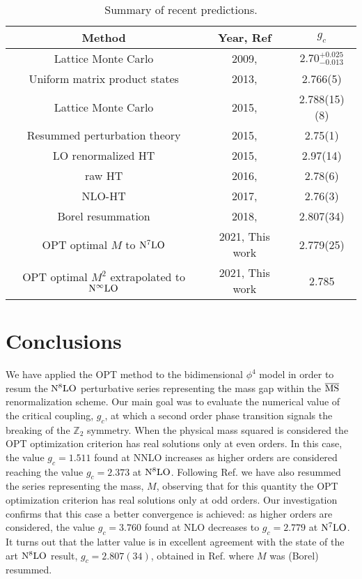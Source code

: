 \documentclass[a4paper,11pt]{article}
\def\ms{\overline {\rm MS}}
\begin{document}
\begin{table}[ht!]
    \centering
    \begin{tabular}{ |c|c|c| }
        \hline
        Method & Year, Ref & $g_c$  \\
        \hline\hline
        Lattice Monte Carlo & 2009, \cite{lattice5} & $2.70^{+0.025}_{-0.013}$   \\ 
        Uniform matrix product states & 2013, \cite{lattice2} & 2.766(5)    \\
        Lattice Monte Carlo & 2015, \cite{lattice1} & 2.788(15)(8)  \\
        Resummed perturbation theory & 2015, \cite{rpt} & 2.75(1) \\
        \hline
        LO renormalized HT & 2015, \cite{hamilton1} & 2.97(14) \\
        raw HT & 2016, \cite{hamilton3} & 2.78(6) \\
        NLO-HT & 2017, \cite{hamilton7} & 2.76(3)\\
        \hline
        Borel resummation & 2018, \cite{serone1} & 2.807(34) \\
        \hline
        OPT optimal $M$ to ${\rm N}^7{\rm LO}$ & 2021, This work & 2.779(25)\\
        OPT optimal $M^2$ extrapolated to ${\rm N}^\infty{\rm LO}$  & 2021, This work & 2.785\\
        \hline
    \end{tabular}
    \caption{Summary of recent predictions.}
    \label{tabela4}
    \end{table}

 







\section{Conclusions}

We have applied  the OPT method to the bidimensional $\phi^4$ model in order to resum the ${\rm N}^8{\rm LO}$ perturbative series representing the mass gap within the $\ms$ renormalization scheme. Our main goal was to evaluate the numerical value of the critical coupling, $g_c$, at which a second order phase transition signals the  breaking of the $\mathbb{Z}_2$ symmetry. When the physical mass squared  is considered the OPT optimization criterion has real solutions only at even orders. In this case, the value $g_c = 1.511$ found at NNLO increases as higher orders are considered reaching the value $g_c = 2.373$ at ${\rm N}^8{\rm LO}$. Following Ref.  \cite {serone1} we have also resummed the series representing the mass, $M$, observing that  for this quantity the OPT optimization criterion has real solutions only at odd orders. Our investigation confirms that this case  a better convergence is achieved: as higher orders are considered,  the value $g_c = 3.760$ found at NLO decreases to $g_c = 2.779$ at ${\rm N}^7{\rm LO}$. It turns out that the latter value is in excellent agreement with the state of the art ${\rm N}^8{\rm LO}$ result, $g_c = 2.807(34)$, obtained in Ref.  \cite {serone1} where $M$ was (Borel) resummed. 
\end{document}
